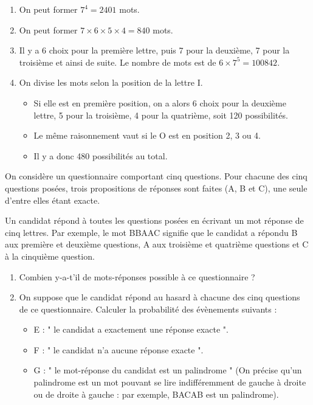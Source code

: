 \documentclass[11pt,fleqn, openany]{book} %
\begin{document}
\begin{solution}\hspace{0pt}
\vspace{-0.5cm}
\begin{enumerate}
\item On peut former $7^4=2401$ mots.
\item On peut former $7 \times 6 \times 5 \times 4 = 840$ mots.
\item Il y a 6 choix pour la première lettre, puis 7 pour la deuxième, 7 pour la troisième et ainsi de suite. Le nombre de mots est de $6 \times 7^5 = 100842$.
\item On divise les mots selon la position de la lettre I.
\begin{itemize}
\item Si elle est en première position, on a alors 6 choix pour la deuxième lettre, 5 pour la troisième, 4 pour la quatrième, soit 120 possibilités.
\item Le même raisonnement vaut si le O est en position 2, 3 ou 4.
\item Il y a donc 480 possibilités au total.
\end{itemize}
\end{enumerate}\end{solution}



\begin{exercise}[subtitle={(Amérique du Sud 2009)}]

On considère un questionnaire comportant cinq questions. Pour chacune des cinq questions posées, trois propositions de réponses sont faites (A, B et C), une seule d'entre elles étant exacte.

Un candidat répond à toutes les questions posées en écrivant un mot réponse
de cinq lettres.
Par exemple, le mot BBAAC signifie que le candidat a répondu B aux première et deuxième questions, A aux troisième et quatrième questions et C à la
cinquième question.
\begin{enumerate}
\item Combien y-a-t'il de mots-réponses possible à ce questionnaire ?
\item On suppose que le candidat répond au hasard à chacune des cinq questions de ce questionnaire. Calculer la probabilité des évènements suivants :
\begin{itemize}
\item E : " le candidat a exactement une réponse exacte ".
\item F : " le candidat n'a aucune réponse exacte ".
\item G : " le mot-réponse du candidat est un palindrome " (On précise qu'un
palindrome est un mot pouvant se lire indifféremment de gauche à droite
ou de droite à gauche : par exemple, BACAB est un palindrome).\end{itemize}
\end{enumerate}\end{exercise}
\end{document}

